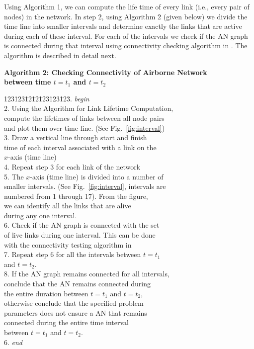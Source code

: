 \documentclass[10pt]{IEEEtran}
\begin{document}
Using Algorithm 1, we can compute the life time of every link (i.e., every pair of nodes) in the network. In step 2, using Algorithm 2 (given below) we divide the time line into smaller intervals and determine exactly the links that are active during each of these interval. For each of the intervals we check if the AN graph is connected during that interval using connectivity checking algorithm in \cite{Cormen}. The algorithm is described in detail next.

\vspace{0.1 in}
\noindent
{\bf Algorithm 2: Checking Connectivity of Airborne Network \\
between time $t = t_1$ and $t = t_2$}

\vspace{0.05in}
\begin{tabbing}
123\=123\=12\=12\=123\=123\=123\= . {\em begin}\\
2. \> Using the Algorithm for Link Lifetime Computation, \\
\> \> compute the lifetimes of links between all node pairs\\
\> \> and plot them over time line. (See Fig.~\ref{fig:interval})\\
3. \> Draw a vertical line through start and finish\\
\> \>  time of each interval associated with a link on the\\
\> \>  $x$-axis (time line)\\
4. \> Repeat step 3 for each link of the network\\
5. \> The $x$-axis (time line) is divided into a number of \\
\> \> smaller intervals. (See Fig.~\ref{fig:interval}, intervals are \\
\> \> numbered from 1 through 17). From the figure,\\
\> \> we can identify all the links that are alive\\
\> \>  during any one interval. \\
6. \>  Check if the AN graph is connected with the set \\
\> \> of live links during one interval. This can be done\\
\> \> with the connectivity testing algorithm in \cite{Cormen}\\
7. \> Repeat step 6 for all the intervals between $t = t_1$ \\
\> \> and $t = t_2$.\\
8. \> If the AN graph remains connected for all intervals, \\
\> \> conclude that the AN remains connected during\\
\> \>  the entire duration between $t = t_1$ and $t = t_2$, \\
\> \> otherwise conclude that the specified problem\\
\> \> parameters does not ensure a AN that remains \\
\> \> connected during the entire time interval \\
\> \> between  $t = t_1$ and $t = t_2$.\\
6. {\em end}
\end{tabbing}
\end{document}
